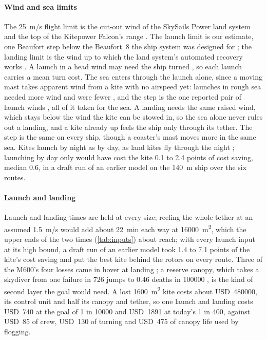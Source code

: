 \paragraph{Wind and sea limits} The \SI{25}{m/s} flight limit is the cut-out wind of the SkySails Power land system \citep{skypower100_tib} and the top of the Kitepower Falcon's range \citep{kitepower2024}. The launch limit is our estimate, one Beaufort step below the Beaufort~8 the ship system was designed for \citep{noaa2009}; the landing limit is the wind up to which the land system's automated recovery works \citep{skypower100_tib}. A launch in a head wind may need the ship turned \citep{wiwo2008}, so each launch carries a mean turn cost. The sea enters through the launch alone, since a moving mast takes apparent wind from a kite with no airspeed yet: launches in rough sea needed more wind \citep{paulig2013} and were fewer \citep{cedelft2016}, and the step is the one reported pair of launch winds \citep{paulig2013}, all of it taken for the sea. A landing needs the same raised wind, which stays below the wind the kite can be stowed in, so the sea alone never rules out a landing, and a kite already up feels the ship only through its tether. The step is the same on every ship, though a coaster's mast moves more in the same sea. Kites launch by night as by day, as land kites fly through the night \citep{skypower100_tib}; launching by day only would have cost the kite 0.1 to 2.4 points of cost saving, median 0.6, in a draft run of an earlier model on the \SI{140}{m} ship over the six routes.

\paragraph{Launch and landing}
\label{app:launch_loss}
Launch and landing times are held at every size; reeling the whole tether at an assumed \SI{1.5}{m/s} would add about \SI{22}{min} each way at \SI{16000}{m^2}, which the upper ends of the two times (\cref{tab:inputs}) about reach; with every launch input at its high bound, a draft run of an earlier model took 1.4 to 7.1 points of the kite's cost saving and put the best kite behind the rotors on every route. Three of the M600's four losses came in hover at landing \citep[Part I, pp.~248, 355]{echeverri2020part1}; a reserve canopy, which takes a skydiver from one failure in 726 jumps to 0.46 deaths in \num{100000} \citep{uspa2025safety}, is the kind of second layer the goal would need. A lost \SI{1600}{m^2} kite costs about USD~\num{480000}, its control unit and half its canopy and tether, so one launch and landing costs USD~740 at the goal of 1 in \num{10000} and USD~\num{1891} at today's 1 in 400, against USD~85 of crew, USD~130 of turning and USD~475 of canopy life used by flogging.

